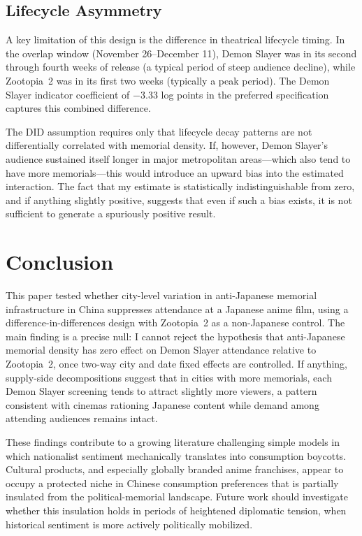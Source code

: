 \documentclass[12pt]{article}
\begin{document}
\subsection{Lifecycle Asymmetry}

A key limitation of this design is the difference in theatrical lifecycle timing. In the overlap window (November 26--December 11), Demon Slayer was in its second through fourth weeks of release (a typical period of steep audience decline), while Zootopia~2 was in its first two weeks (typically a peak period). The Demon Slayer indicator coefficient of $-3.33$ log points in the preferred specification captures this combined difference.

The DID assumption requires only that lifecycle decay patterns are not differentially correlated with memorial density. If, however, Demon Slayer's audience sustained itself longer in major metropolitan areas---which also tend to have more memorials---this would introduce an upward bias into the estimated interaction. The fact that my estimate is statistically indistinguishable from zero, and if anything slightly positive, suggests that even if such a bias exists, it is not sufficient to generate a spuriously positive result.

\section{Conclusion}

This paper tested whether city-level variation in anti-Japanese memorial infrastructure in China suppresses attendance at a Japanese anime film, using a difference-in-differences design with Zootopia~2 as a non-Japanese control. The main finding is a precise null: I cannot reject the hypothesis that anti-Japanese memorial density has zero effect on Demon Slayer attendance relative to Zootopia~2, once two-way city and date fixed effects are controlled. If anything, supply-side decompositions suggest that in cities with more memorials, each Demon Slayer screening tends to attract slightly more viewers, a pattern consistent with cinemas rationing Japanese content while demand among attending audiences remains intact.

These findings contribute to a growing literature challenging simple models in which nationalist sentiment mechanically translates into consumption boycotts. Cultural products, and especially globally branded anime franchises, appear to occupy a protected niche in Chinese consumption preferences that is partially insulated from the political-memorial landscape. Future work should investigate whether this insulation holds in periods of heightened diplomatic tension, when historical sentiment is more actively politically mobilized.
\end{document}
